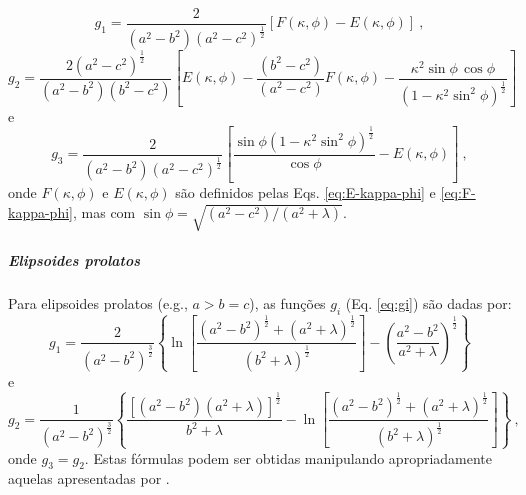 \begin{equation}
g_{1} = \frac{2}{\left( a^{2} - b^{2} \right) \left( a^{2} - c^{2} \right)^{\frac{1}{2}}}
\left[ F(\kappa, \phi) - E(\kappa, \phi) \right] \: ,
\label{eq:g1-triaxial}
\end{equation}
\begin{equation}
g_{2} = \frac{2 \left( a^{2} - c^{2} \right)^{\frac{1}{2}}}
{\left( a^{2} - b^{2} \right)\left( b^{2} - c^{2} \right)}
\left[ E\left(\kappa, \phi \right) 
- \frac{\left( b^{2} - c^{2} \right)}{\left( a^{2} - c^{2} \right)}
F\left(\kappa, \phi \right) 
- \frac{\kappa^{2} \sin\phi \, \cos\phi}
{\left( 1 - \kappa^{2} \sin^{2}\phi \right)^{\frac{1}{2}}}
\right]
\label{eq:g2-triaxial}
\end{equation}
e
\begin{equation}
g_{3} = \frac{2}{\left( a^{2} - b^{2} \right) \left( a^{2} - c^{2} \right)^{\frac{1}{2}}}
\left[ \frac{\sin\phi \left( 1 - \kappa^{2} \sin^{2}\phi \right)^{\frac{1}{2}}}
{\cos\phi}  - E\left(\kappa, \phi \right) \right]
\: ,
\label{eq:g3-triaxial}
\end{equation}
onde $F(\kappa, \phi)$ e $E(\kappa, \phi)$ são definidos pelas
Eqs. \ref{eq:E-kappa-phi} e \ref{eq:F-kappa-phi},
mas com
$\sin \phi = \sqrt{\left( a^{2} - c^{2} \right)/\left( a^{2} + \lambda \right)}$.

\subparagraph*{Elipsoides prolatos}


Para elipsoides prolatos (e.g., $a > b = c$), as funções
$g_{i}$ (Eq. \ref{eq:gi}) são dadas por:
\begin{equation}
g_{1} =  \frac{2}{\left( a^{2} - b^{2} \right)^{\frac{3}{2}}}
\left\lbrace
\ln \left[ \frac{\left( a^{2} - b^{2} \right)^{\frac{1}{2}} + 
	\left( a^{2} + \lambda \right)^{\frac{1}{2}}}{
	\left( b^{2} + \lambda \right)^{\frac{1}{2}}} \right] -
\left( \frac{a^{2} - b^{2}}{a^{2} + \lambda} \right)^{\frac{1}{2}}
\right\rbrace
\label{eq:g1-prolate}
\end{equation}
e
\begin{equation}
g_{2} =  \frac{1}{\left( a^{2} - b^{2} \right)^{\frac{3}{2}}}
\left\lbrace
\frac{\left[ \left( a^{2} - b^{2} \right)
	\left( a^{2} + \lambda \right) \right]^{\frac{1}{2}}}
{b^{2} + \lambda} -
\ln \left[ \frac{\left( a^{2} - b^{2} \right)^{\frac{1}{2}} + 
	\left( a^{2} + \lambda \right)^{\frac{1}{2}}}{
	\left( b^{2} + \lambda \right)^{\frac{1}{2}}} \right]
\right\rbrace \: ,
\label{eq:g2-prolate}
\end{equation}
onde $g_{3} = g_{2}$.
Estas fórmulas podem ser obtidas manipulando apropriadamente aquelas
apresentadas por \citep{emerson1985}.


